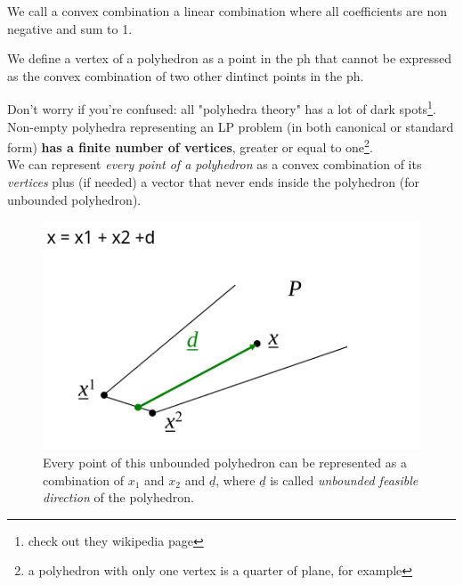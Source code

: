             \begin{definition}
                We call a convex combination a linear combination where all coefficients are non negative and sum to 1.
            \end{definition}
            \begin{definition}[Vertex]
                We define a vertex of a polyhedron as a point in the ph that cannot be expressed as the convex combination of two other dintinct points in the ph.
            \end{definition}
            Don't worry if you're confused: all "polyhedra theory" has a lot of dark spots\footnote{check out they wikipedia page}. Non-empty polyhedra representing an LP problem (in both canonical or standard form) \textbf{has a finite number of vertices}, greater or equal to one\footnote{a polyhedron with only one vertex is a quarter of plane, for example}.\\
            We can represent \textit{every point of a polyhedron} as a convex combination of its \textit{vertices} plus (if needed) a vector that never ends inside the polyhedron (for unbounded polyhedron).
            \begin{figure}[H]
                \centering
                \includegraphics{./images/Polyhedron2.png}
                \caption{Every point of this unbounded polyhedron can be represented as a combination of $x_1$ and $x_2$ and $\underline{d}$, where $\underline{d}$ is called \textit{unbounded feasible direction} of the polyhedron.} 
            \end{figure}


